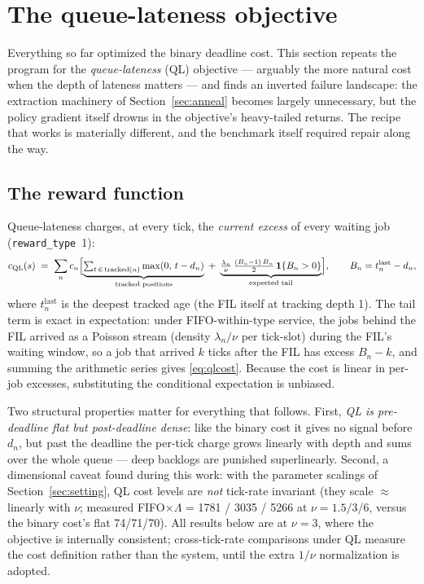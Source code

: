 \documentclass[11pt,a4paper]{article}
\begin{document}
\section{The queue-lateness objective}
\label{sec:ql}

Everything so far optimized the binary deadline cost.  This section
repeats the program for the \emph{queue-lateness} (QL) objective ---
arguably the more natural cost when the depth of lateness matters ---
and finds an inverted failure landscape: the extraction machinery of
Section~\ref{sec:anneal} becomes largely unnecessary, but the policy
gradient itself drowns in the objective's heavy-tailed returns.  The
recipe that works is materially different, and the benchmark itself
required repair along the way.

\subsection{The reward function}
\label{sec:qlreward}

Queue-lateness charges, at every tick, the \emph{current excess} of every
waiting job (\texttt{reward\_type}~1):
\begin{equation}
  c_{\mathrm{QL}}(s) \;=\; \sum_n c_n \Bigl[
    \underbrace{\textstyle\sum_{t \,\in\, \mathrm{tracked}(n)} \max(0,\, t - d_n)}_{\text{tracked positions}}
    \;+\;
    \underbrace{\tfrac{\lambda_n}{\nu}\,\tfrac{(B_n-1)\,B_n}{2}\,\mathbf{1}\{B_n > 0\}}_{\text{expected tail}}
  \Bigr],
  \qquad B_n = t^{\mathrm{last}}_n - d_n,
  \label{eq:qlcost}
\end{equation}
where $t^{\mathrm{last}}_n$ is the deepest tracked age (the FIL itself at
tracking depth 1).  The tail term is exact in expectation: under
FIFO-within-type service, the jobs behind the FIL arrived as a Poisson
stream (density $\lambda_n/\nu$ per tick-slot) during the FIL's waiting
window, so a job that arrived $k$ ticks after the FIL has excess
$B_n - k$, and summing the arithmetic series gives \eqref{eq:qlcost}.
Because the cost is linear in per-job excesses, substituting the
conditional expectation is unbiased.

Two structural properties matter for everything that follows.  First,
\emph{QL is pre-deadline flat but post-deadline dense}: like the binary
cost it gives no signal before $d_n$, but past the deadline the per-tick
charge grows linearly with depth and sums over the whole queue --- deep
backlogs are punished superlinearly.  Second, a dimensional caveat found
during this work: with the parameter scalings of
Section~\ref{sec:setting}, QL cost levels are \emph{not} tick-rate
invariant (they scale $\approx$ linearly with $\nu$; measured
FIFO$\times\Lambda$ = 1781 / 3035 / 5266 at $\nu = 1.5/3/6$, versus the
binary cost's flat 74/71/70).  All results below are at $\nu = 3$, where
the objective is internally consistent; cross-tick-rate comparisons under
QL measure the cost definition rather than the system, until the extra
$1/\nu$ normalization is adopted.
\end{document}
